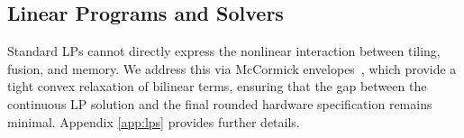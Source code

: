 \subsection{Linear Programs and Solvers}
\label{sec:lps}
Standard LPs cannot directly express the nonlinear interaction between tiling, fusion, and memory. We address this via McCormick envelopes~\citep{mccormick1976computability}, which provide a tight convex relaxation of bilinear terms, ensuring that the gap between the continuous LP solution and the final rounded hardware specification remains minimal. Appendix \ref{app:lps} provides further details.
